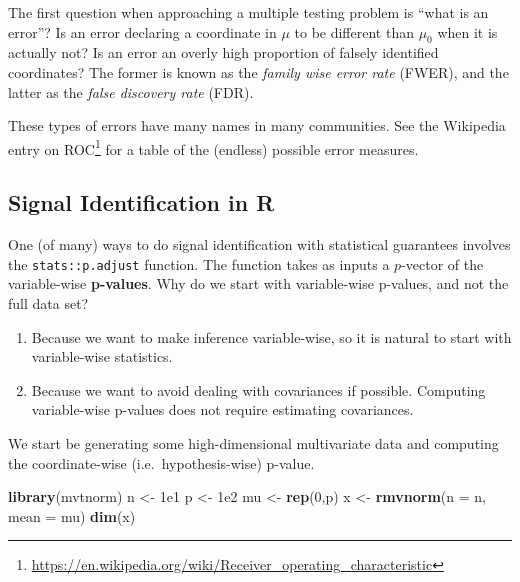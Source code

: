 \documentclass[]{book}
\newenvironment{Shaded}{\begin{snugshade}}{\end{snugshade}}
\newcommand{\DataTypeTok}[1]{\textcolor[rgb]{0.13,0.29,0.53}{#1}}
\newcommand{\DecValTok}[1]{\textcolor[rgb]{0.00,0.00,0.81}{#1}}
\newcommand{\FloatTok}[1]{\textcolor[rgb]{0.00,0.00,0.81}{#1}}
\newcommand{\KeywordTok}[1]{\textcolor[rgb]{0.13,0.29,0.53}{\textbf{#1}}}
\newcommand{\NormalTok}[1]{#1}
\newcommand{\StringTok}[1]{\textcolor[rgb]{0.31,0.60,0.02}{#1}}
\providecommand{\tightlist}{%
  \setlength{\itemsep}{0pt}\setlength{\parskip}{0pt}}
\renewcommand{\href}[2]{#2\footnote{\url{#1}}}
\theoremstyle{definition}
\theoremstyle{definition}
\theoremstyle{definition}
\theoremstyle{remark}
\let\BeginKnitrBlock\begin \let\EndKnitrBlock\end
\begin{document}
The first question when approaching a multiple testing problem is ``what is an error''?
Is an error declaring a coordinate in \(\mu\) to be different than \(\mu_0\) when it is actually not?
Is an error an overly high proportion of falsely identified coordinates?
The former is known as the \emph{family wise error rate} (FWER), and the latter as the \emph{false discovery rate} (FDR).

\BeginKnitrBlock{remark}
{}These types of errors have many names in many communities.
See the Wikipedia entry on \href{https://en.wikipedia.org/wiki/Receiver_operating_characteristic}{ROC} for a table of the (endless) possible error measures.
\EndKnitrBlock{remark}

\hypertarget{signal-identification-in-r}{%
\subsection{Signal Identification in R}\label{signal-identification-in-r}}

One (of many) ways to do signal identification with statistical guarantees involves the \texttt{stats::p.adjust} function.
The function takes as inputs a \(p\)-vector of the variable-wise \textbf{p-values}.
Why do we start with variable-wise p-values, and not the full data set?

\begin{enumerate}
\def\labelenumi{\alph{enumi}.}
\tightlist
\item
  Because we want to make inference variable-wise, so it is natural to start with variable-wise statistics.
\item
  Because we want to avoid dealing with covariances if possible. Computing variable-wise p-values does not require estimating covariances.
\end{enumerate}

We start be generating some high-dimensional multivariate data and computing the coordinate-wise (i.e.~hypothesis-wise) p-value.

\begin{Shaded}
\begin{Highlighting}[]
\KeywordTok{library}\NormalTok{(mvtnorm)}
\NormalTok{n <-}\StringTok{ }\FloatTok{1e1}
\NormalTok{p <-}\StringTok{ }\FloatTok{1e2}
\NormalTok{mu <-}\StringTok{ }\KeywordTok{rep}\NormalTok{(}\DecValTok{0}\NormalTok{,p)}
\NormalTok{x <-}\StringTok{ }\KeywordTok{rmvnorm}\NormalTok{(}\DataTypeTok{n =}\NormalTok{ n, }\DataTypeTok{mean =}\NormalTok{ mu)}
\KeywordTok{dim}\NormalTok{(x)}
\end{Highlighting}
\end{Shaded}
\end{document}
